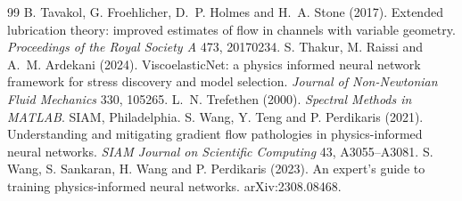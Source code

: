\documentclass[11pt,a4paper]{article}
\begin{document}
\begin{thebibliography}{99}
 B. Tavakol, G. Froehlicher, D.~P. Holmes and H.~A. Stone (2017). Extended lubrication theory: improved estimates of flow in channels with variable geometry. \emph{Proceedings of the Royal Society A} 473, 20170234.
 S. Thakur, M. Raissi and A.~M. Ardekani (2024). ViscoelasticNet: a physics informed neural network framework for stress discovery and model selection. \emph{Journal of Non-Newtonian Fluid Mechanics} 330, 105265.
 L.~N. Trefethen (2000). \emph{Spectral Methods in MATLAB}. SIAM, Philadelphia.
 S. Wang, Y. Teng and P. Perdikaris (2021). Understanding and mitigating gradient flow pathologies in physics-informed neural networks. \emph{SIAM Journal on Scientific Computing} 43, A3055--A3081.
 S. Wang, S. Sankaran, H. Wang and P. Perdikaris (2023). An expert's guide to training physics-informed neural networks. arXiv:2308.08468.
\end{thebibliography}
\end{document}
